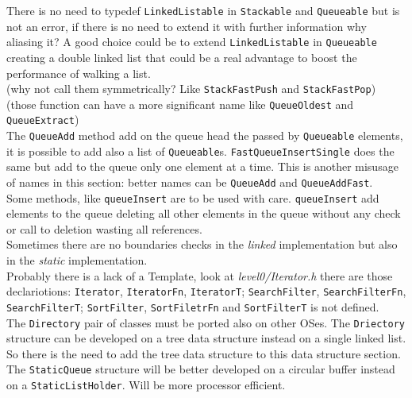 There is no need to typedef \texttt{LinkedListable} in \texttt{Stackable} and \texttt{Queueable} but is not an error, if there is no need to extend it with further information why aliasing it? A good choice could be to extend \texttt{LinkedListable} in \texttt{Queueable} creating a double linked list that could be a real advantage to boost the performance of walking a list.\\

 (why not call them symmetrically? Like \texttt{StackFastPush} and \texttt{StackFastPop}) \\
(those function can have a more significant name like \texttt{QueueOldest} and \texttt{QueueExtract}) \\
The \texttt{QueueAdd} method add on the queue head the passed by \texttt{Queueable} elements, it is possible to add also a list of \texttt{Queueable}s. \texttt{FastQueueInsertSingle} does the same but add to the queue only one element at a time. This is another misusage of names in this section: better names can be \texttt{QueueAdd} and \texttt{QueueAddFast}. \\


Some methods, like \texttt{queueInsert} are to be used with care. \texttt{queueInsert} add elements to the queue deleting all other elements in the queue without any check or call to deletion wasting all references.\\


Sometimes there are no boundaries checks in the \textit{linked} implementation but also in the \textit{static} implementation.\\


Probably there is a lack of a Template, look at \textit{level0/Iterator.h} there are those declariotions: \texttt{Iterator}, \texttt{IteratorFn}, \texttt{IteratorT}; \texttt{SearchFilter}, \texttt{SearchFilterFn}, \texttt{SearchFilterT}; \texttt{SortFilter}, \texttt{SortFiletrFn} and \texttt{SortFilterT} is not defined.\\


The \texttt{Directory} pair of classes must be ported also on other OSes. The \texttt{Driectory} structure can be developed on a tree data structure instead on a single linked list. So there is the need to add the tree data structure to this data structure section. \\


The \texttt{StaticQueue} structure will be better developed on a circular buffer instead on a \texttt{StaticListHolder}. Will be more processor efficient.\\



